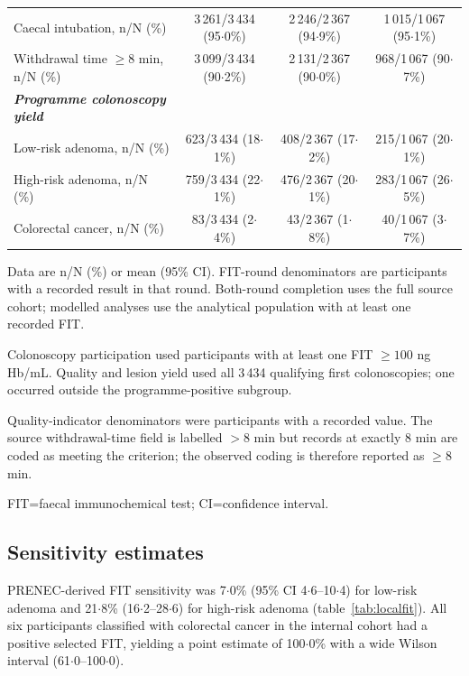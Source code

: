 \documentclass[10pt,a4paper]{article}
\newcommand{\dec}{\ensuremath{\cdot}}
\begin{document}
\begin{table}[p]
\begin{threeparttable}
\begin{tabularx}{\linewidth}{@{}>{\raggedright\arraybackslash}X C C C@{}}
Caecal intubation, n/N (\%) &
3\,261/3\,434 (95\dec{}0\%) &
2\,246/2\,367 (94\dec{}9\%) &
1\,015/1\,067 (95\dec{}1\%)\\
Withdrawal time $\geq8$ min, n/N (\%) &
3\,099/3\,434 (90\dec{}2\%) &
2\,131/2\,367 (90\dec{}0\%) &
968/1\,067 (90\dec{}7\%)\\
\addlinespace
\textit{\textbf{Programme colonoscopy yield}} & & &\\
Low-risk adenoma, n/N (\%) &
623/3\,434 (18\dec{}1\%) &
408/2\,367 (17\dec{}2\%) &
215/1\,067 (20\dec{}1\%)\\
High-risk adenoma, n/N (\%) &
759/3\,434 (22\dec{}1\%) &
476/2\,367 (20\dec{}1\%) &
283/1\,067 (26\dec{}5\%)\\
Colorectal cancer, n/N (\%) &
83/3\,434 (2\dec{}4\%) &
43/2\,367 (1\dec{}8\%) &
40/1\,067 (3\dec{}7\%)\\
\bottomrule
\end{tabularx}
\begin{tablenotes}[flushleft]
\scriptsize
\item[] Data are n/N (\%) or mean (95\% CI). FIT-round denominators are
participants with a recorded result in that round. Both-round completion uses
the full source cohort; modelled analyses use the analytical population with at
least one recorded FIT.
\item[] Colonoscopy participation used participants with at least one FIT
$\geq100$ ng Hb/mL. Quality and lesion yield used all 3\,434 qualifying first
colonoscopies; one occurred outside the programme-positive subgroup.
\item[] Quality-indicator denominators were participants with a recorded
value. The source withdrawal-time field is labelled $>8$ min but records at
exactly 8 min are coded as meeting the criterion; the observed coding is
therefore reported as $\geq8$ min.
\item[] FIT=faecal immunochemical test; CI=confidence interval.
\end{tablenotes}
\end{threeparttable}
\end{table}

\subsection*{Sensitivity estimates}

PRENEC-derived FIT sensitivity was 7\dec{}0\% (95\% CI
4\dec{}6--10\dec{}4) for low-risk adenoma and 21\dec{}8\%
(16\dec{}2--28\dec{}6) for high-risk adenoma
(table~\ref{tab:localfit}). All six participants classified with colorectal
cancer in the internal cohort had a positive selected FIT, yielding a point
estimate of 100\dec{}0\% with a wide Wilson interval
(61\dec{}0--100\dec{}0).
\end{document}
